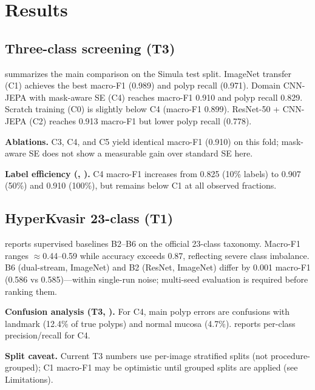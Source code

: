 \section{Results}
\label{sec:results}






\subsection{Three-class screening (T3)}
 summarizes the main comparison on the Simula test split.
ImageNet transfer (C1) achieves the best macro-F1 (0.989) and polyp recall (0.971).
Domain CNN-JEPA with mask-aware SE (C4) reaches macro-F1 0.910 and polyp recall 0.829.
Scratch training (C0) is slightly below C4 (macro-F1 0.899).
ResNet-50 + CNN-JEPA (C2) reaches 0.913 macro-F1 but lower polyp recall (0.778).

\textbf{Ablations.} C3, C4, and C5 yield identical macro-F1 (0.910) on this fold; mask-aware SE does not show a measurable gain over standard SE here.

\textbf{Label efficiency (, ).}
C4 macro-F1 increases from 0.825 (10\% labels) to 0.907 (50\%) and 0.910 (100\%), but remains below C1 at all observed fractions.

\subsection{HyperKvasir 23-class (T1)}
 reports supervised baselines B2--B6 on the official 23-class taxonomy.
Macro-F1 ranges $\approx$0.44--0.59 while accuracy exceeds 0.87, reflecting severe class imbalance.
B6 (dual-stream, ImageNet) and B2 (ResNet, ImageNet) differ by 0.001 macro-F1 (0.586 vs 0.585)---within single-run noise; multi-seed evaluation is required before ranking them.

\textbf{Confusion analysis (T3, ).}
For C4, main polyp errors are confusions with landmark (12.4\% of true polyps) and normal mucosa (4.7\%).
 reports per-class precision/recall for C4.

\textbf{Split caveat.} Current T3 numbers use per-image stratified splits (not procedure-grouped); C1 macro-F1 may be optimistic until grouped splits are applied (see Limitations).
